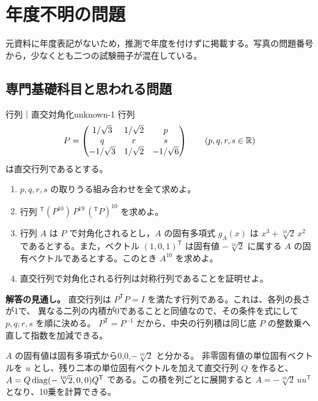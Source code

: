 \chapter{年度不明の問題}
\label{ch:unknown}

\begin{memo*}
元資料に年度表記がないため，推測で年度を付けずに掲載する。写真の問題番号から，少なくとも二つの試験冊子が混在している。
\end{memo*}

\section{専門基礎科目と思われる問題}

\begin{problem}{行列｜直交対角化}{unknown-1}
行列
\[
P=\begin{pmatrix}
1/\sqrt3&1/\sqrt2&p\\
q&r&s\\
-1/\sqrt3&1/\sqrt2&-1/\sqrt6
\end{pmatrix}
\qquad(p,q,r,s\in\mathbb{R})
\]
は直交行列であるとする。
\begin{enumerate}
  \item[(1)] $p,q,r,s$ の取りうる組み合わせを全て求めよ。
  \item[(2)] 行列 ${}^{\mathsf T}(P^{10})\,P^{19}\,({}^{\mathsf T}P)^{10}$ を求めよ。
  \item[(3)] 行列 $A$ は $P$ で対角化されるとし，$A$ の固有多項式 $g_A(x)$ は $x^3+\sqrt[10]{2}\,x^2$ であるとする。また，ベクトル $(1,0,1)^{\mathsf T}$ は固有値 $-\sqrt[10]{2}$ に属する $A$ の固有ベクトルであるとする。このとき $A^{10}$ を求めよ。
  \item[(4)] 直交行列で対角化される行列は対称行列であることを証明せよ。
\end{enumerate}
\end{problem}
\begin{memo*}
\textbf{解答の見通し。}
直交行列は $P^{\mathsf T}P=I$ を満たす行列である。これは、各列の長さが1で、
異なる二列の内積が0であることと同値なので、その条件を式にして $p,q,r,s$ を順に決める。
$P^{\mathsf T}=P^{-1}$ だから、中央の行列積は同じ底 $P$ の整数乗へ直して指数を加減できる。

$A$ の固有値は固有多項式から0,0,$-\sqrt[10]{2}$ と分かる。
非零固有値の単位固有ベクトルを $u$ とし、残り二本の単位固有ベクトルを加えて直交行列 $Q$ を作ると、
$A=Q\operatorname{diag}(-\sqrt[10]{2},0,0)Q^{\mathsf T}$ である。この積を列ごとに展開すると
$A=-\sqrt[10]{2}\,uu^{\mathsf T}$ となり、10乗を計算できる。
\end{memo*}
